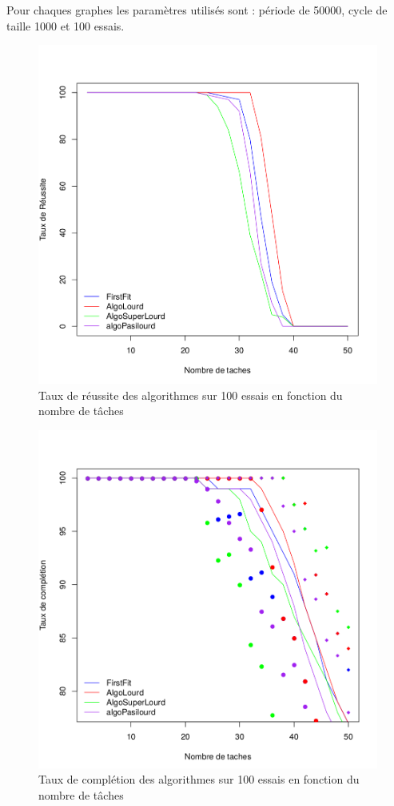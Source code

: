 \documentclass[11pt]{article}
\begin{document}
\newpage
Pour chaques graphes les paramètres utilisés sont : période de 50000, cycle de taille 1000 et 100 essais.
\begin{figure}[!ht]
    \center
    \includegraphics[scale = 0.4]{taux_reussite}
    \caption{Taux de réussite des algorithmes sur 100 essais en fonction du nombre de tâches}
\end{figure} 

\begin{figure}[!ht]
    \center
    \includegraphics[scale = 0.4]{taux_completion}
    \caption{Taux de complétion des algorithmes sur 100 essais en fonction du nombre de tâches}
\end{figure}
\end{document}
